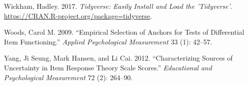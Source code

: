 \documentclass[
  11pt,
]{article}
\begin{document}
\leavevmode\hypertarget{ref-tidy}{}%
Wickham, Hadley. 2017. \emph{Tidyverse: Easily Install and Load the 'Tidyverse'}. \url{https://CRAN.R-project.org/package=tidyverse}.

\leavevmode\hypertarget{ref-woods2009empirical}{}%
Woods, Carol M. 2009. ``Empirical Selection of Anchors for Tests of Differential Item Functioning.'' \emph{Applied Psychological Measurement} 33 (1): 42--57.

\leavevmode\hypertarget{ref-yang2012characterizing}{}%
Yang, Ji Seung, Mark Hansen, and Li Cai. 2012. ``Characterizing Sources of Uncertainty in Item Response Theory Scale Scores.'' \emph{Educational and Psychological Measurement} 72 (2): 264--90.
\end{document}
